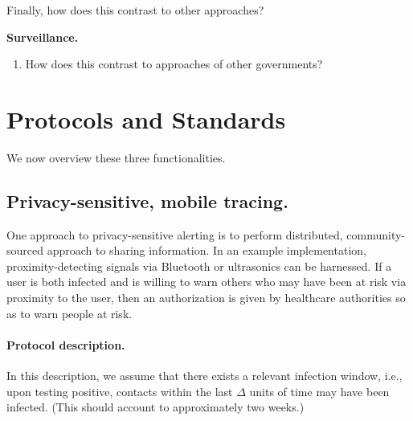 \documentclass{article}
\begin{document}
Finally, how does this contrast to other approaches?

\textbf{Surveillance.}
\begin{enumerate}[leftmargin=*]
\item How does this contrast to approaches of other governments?
\end{enumerate}

\section{Protocols and Standards} 
We now overview these three functionalities.


\subsection{Privacy-sensitive, mobile tracing.} 
One approach to privacy-sensitive alerting is to perform distributed, community-sourced approach to sharing information. In an example implementation, proximity-detecting signals via Bluetooth or ultrasonics can be harnessed.  If a user is both infected and is willing to warn others who may have been at risk via proximity to the user, then an authorization is given by healthcare authorities so as to warn people at risk.

\paragraph{Protocol description.} In this description, we assume that there exists a relevant infection window, i.e., upon testing positive, contacts within the last $\Delta$ units of time may have been infected. (This should account to approximately two weeks.)
\end{document}

